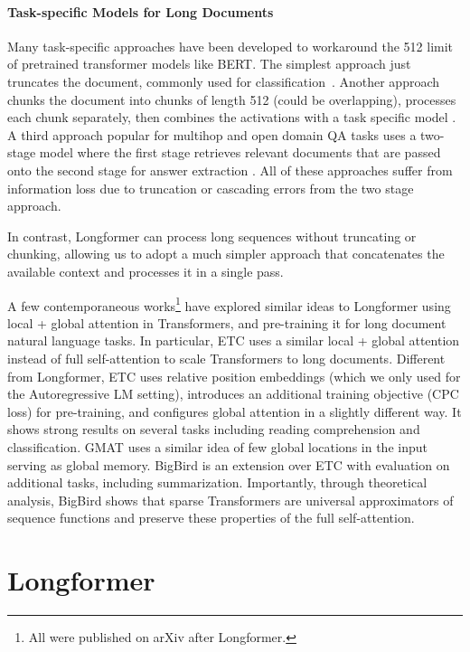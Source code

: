 \paragraph{Task-specific Models for Long Documents} Many task-specific approaches have been developed to workaround the 512 limit of pretrained transformer models like BERT. The simplest approach just truncates the document, commonly used for classification~\cite{truncateimdb}. Another approach chunks the document into chunks of length 512 (could be overlapping), processes each chunk separately, then combines the activations with a task specific model \cite{joshi-etal-2019-bert}. A third approach popular for multihop and open domain QA tasks uses a two-stage model where the first stage retrieves relevant documents that are passed onto the second stage for answer extraction \cite{Clark2017SimpleAE,Chen2017ReadingWT}. All of these approaches suffer from information loss due to truncation or cascading errors from the two stage approach.

In contrast, Longformer can process long sequences without truncating or chunking, allowing us to adopt a much simpler approach that concatenates the available context and processes it in a single pass. 

A few contemporaneous works\footnote{All were published on arXiv after Longformer.} have explored similar ideas to Longformer using local + global attention in Transformers, and pre-training it for long document natural language tasks. In particular, ETC \cite{ainslie-etal-2020-etc} uses a similar local + global attention instead of full self-attention to scale Transformers to long documents. Different from Longformer, ETC uses relative position embeddings (which we only used for the Autoregressive LM setting), introduces an additional training objective (CPC loss) for pre-training, and configures global attention in a slightly different way. It shows strong results on several tasks including reading comprehension and classification. GMAT \cite{Gupta2020GMATGM} uses a similar idea of few global locations in the input serving as global memory. BigBird \cite{Zaheer2020BigBT} is an extension over ETC with evaluation on additional tasks, including summarization. Importantly, through theoretical analysis, BigBird shows that sparse Transformers are universal approximators of sequence functions and preserve these properties of the full self-attention.

\section{Longformer}
\label{sec:model}

